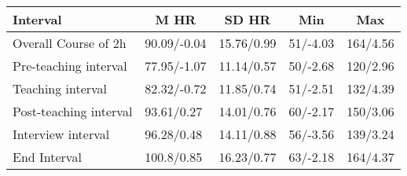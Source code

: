 


\begin{table}[h]

\begin{center}
\begin{threeparttable}

\caption{\label{tab:unnamed-chunk-1}}

\begin{tabular}{lllll}
\toprule
Interval & \multicolumn{1}{c}{M HR} & \multicolumn{1}{c}{SD HR} & \multicolumn{1}{c}{Min} & \multicolumn{1}{c}{Max}\\
\midrule
Overall Course of 2h & 90.09/-0.04 & 15.76/0.99 & 51/-4.03 & 164/4.56\\
Pre-teaching interval & 77.95/-1.07 & 11.14/0.57 & 50/-2.68 & 120/2.96\\
Teaching interval & 82.32/-0.72 & 11.85/0.74 & 51/-2.51 & 132/4.39\\
Post-teaching interval & 93.61/0.27 & 14.01/0.76 & 60/-2.17 & 150/3.06\\
Interview interval & 96.28/0.48 & 14.11/0.88 & 56/-3.56 & 139/3.24\\
End Interval & 100.8/0.85 & 16.23/0.77 & 63/-2.18 & 164/4.37\\
\bottomrule
\end{tabular}

\end{threeparttable}
\end{center}

\end{table}



